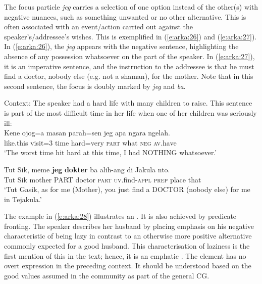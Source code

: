 \documentclass[output=paper
,modfonts
,nonflat]{langsci/langscibook}
\begin{document}
\noindent
The focus particle \textit{jeg} carries a selection of one option instead of the other(s) with negative nuances, such as something unwanted or no other alternative. This is often associated with an event/action carried out against the speaker’s/addressee’s wishes. This is exemplified in (\ref{e:arka:26}) and (\ref{e:arka:27}). In (\ref{e:arka:26}), the  \textit{jeg} appears with the negative sentence, highlighting the absence of any possession whatsoever on the part of the speaker. In (\ref{e:arka:27}), it is an imperative sentence, and the instruction to the addressee is that he must find a doctor, nobody else (e.g. not a shaman), for the mother. Note that in this second sentence, the focus is doubly marked by \textit{jeg} and \textit{ba}.

\begin{exe}
	\ex\label{e:arka:26}{Context: The speaker had a hard life with many children to raise. This sentence is part of the most difficult time in her life when one of her children was seriously ill: }\\
	\gll Kene   ojog=a  masan   parah=sen  jeg   apa  ngara  ngelah.\\
	like.this  visit=3  time   hard=very  \textsc{part}  what   \textsc{neg}  \textsc{av}.have\\
	\glt ‘The worst time hit hard at this time, I had NOTHING whatsoever.’
\end{exe}

\begin{exe}
	\ex\label{e:arka:27}
	\gll Tut Sik,  meme   \textbf{jeg} \textbf{dokter}  ba alih-ang    di  Jakula   nto.\\
	Tut Sik  mother   PART  doctor  \textsc{part}  \textsc{uv}.find-\textsc{appl}  \textsc{prep}  place  that\\
	\glt ‘Tut Gasik, as for me (Mother), you just find a DOCTOR (nobody else) for me in Tejakula.’
\end{exe}

\noindent
The example in (\ref{e:arka:28}) illustrates an . It is also achieved by predicate fronting. The speaker describes her husband by placing emphasis on his negative characteristic of being lazy in contrast to an otherwise more positive alternative commonly expected for a good husband. This characterisation of laziness is the first mention of this in the text; hence, it is an emphatic . The  element has no overt expression in the preceding context. It should be understood based on the good values assumed in the community as part of the general CG.
\end{document}
